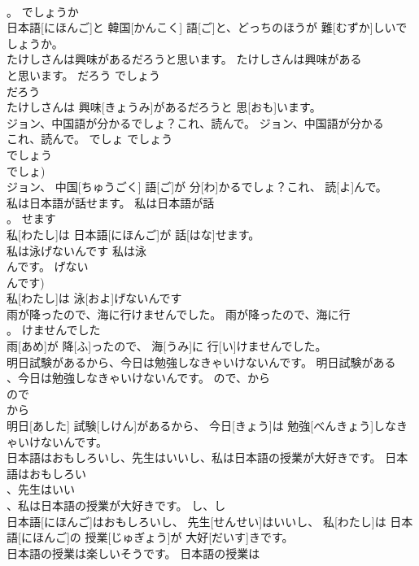 \documentclass[8pt]{extreport}
\begin{document}
\begin{CJK}{UTF8}{min}
\\	。	でしょうか	
\\	日本語[にほんご]と 韓国[かんこく] 語[ご]と、どっちのほうが 難[むずか]しいでしょうか。	
\\	たけしさんは興味があるだろうと思います。	たけしさんは興味がある
\\	と思います。	だろう	でしょう 
\\	だろう 
\\	たけしさんは 興味[きょうみ]があるだろうと 思[おも]います。	
\\	ジョン、中国語が分かるでしょ？これ、読んで。	ジョン、中国語が分かる
\\	これ、読んで。	でしょ	でしょう 
\\	でしょう 
\\	でしょ) 
\\	ジョン、 中国[ちゅうごく] 語[ご]が 分[わ]かるでしょ？これ、 読[よ]んで。	
\\	私は日本語が話せます。	私は日本語が話
\\	。	せます	
\\	私[わたし]は 日本語[にほんご]が 話[はな]せます。	
\\	私は泳げないんです	私は泳
\\	んです。	げない	
\\	んです)	
\\	私[わたし]は 泳[およ]げないんです	
\\	雨が降ったので、海に行けませんでした。	雨が降ったので、海に行
\\	。	けませんでした	
\\	雨[あめ]が 降[ふ]ったので、 海[うみ]に 行[い]けませんでした。	
\\	明日試験があるから、今日は勉強しなきゃいけないんです。	明日試験がある
\\	、今日は勉強しなきゃいけないんです。	ので、から	
\\	ので 
\\	から 
\\	明日[あした] 試験[しけん]があるから、 今日[きょう]は 勉強[べんきょう]しなきゃいけないんです。	
\\	日本語はおもしろいし、先生はいいし、私は日本語の授業が大好きです。	日本語はおもしろい
\\	、先生はいい
\\	、私は日本語の授業が大好きです。	し、し	
\\	日本語[にほんご]はおもしろいし、 先生[せんせい]はいいし、 私[わたし]は 日本語[にほんご]の 授業[じゅぎょう]が 大好[だいす]きです。	
\\	日本語の授業は楽しいそうです。	日本語の授業は

\end{CJK}
\end{document}
